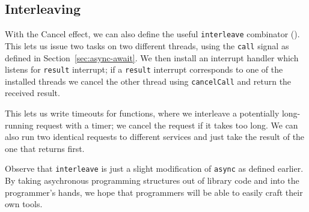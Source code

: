 \documentclass[msc,deptreport,cs]{infthesis} %
\newcommand{\code}[1]{\lstinline{#1}}
\newcommand{\texthighlight}[1]{%
  \colorbox{red!20}{#1}}
\begin{document}



\subsection{Interleaving}

With the \textsf{Cancel} effect, we can also define the useful \code{interleave}
combinator (\cite{leijen2017structured}).
%
This lets us issue two tasks on two different threads, using the \code{call}
signal as defined in Section~\ref{sec:async-await}. We then install an interrupt
handler which listens for \code{result} interrupt; if a \code{result} interrupt
corresponds to one of the installed threads we cancel the other thread using
\code{cancelCall} and return the received result.

This lets us write timeouts for functions, where we interleave a potentially
long-running request with a timer; we cancel the request if it takes too long.
We can also run two identical requests to different services and just take the
result of the one that returns first.


Observe that \code{interleave} is just a slight modification of \code{async} as
defined earlier. By taking asychronous programming structures out of library
code and into the programmer's hands, we hope that programmers will be able to
easily craft their own tools.

\end{document}

